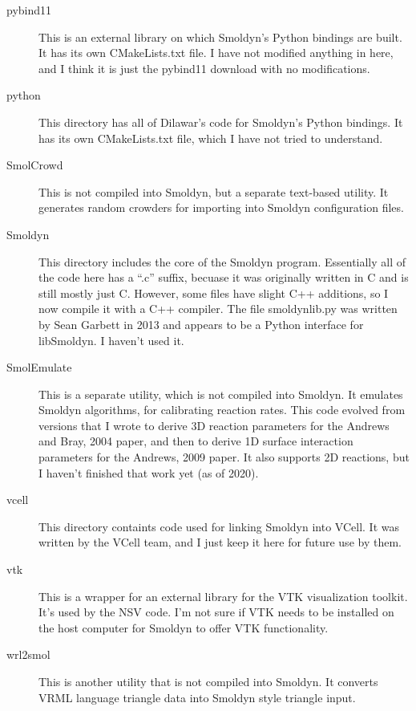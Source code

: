 \documentclass {scrbook}
\begin{document}
\begin{description}
\item[pybind11] This is an external library on which Smoldyn's Python bindings are built. It has its own CMakeLists.txt file. I have not modified anything in here, and I think it is just the pybind11 download with no modifications.

\item[python] This directory has all of Dilawar's code for Smoldyn's Python bindings. It has its own CMakeLists.txt file, which I have not tried to understand.

\item[SmolCrowd] This is not compiled into Smoldyn, but a separate text-based utility. It generates random crowders for importing into Smoldyn configuration files.

\item[Smoldyn] This directory includes the core of the Smoldyn program. Essentially all of the code here has a ``.c'' suffix, becuase it was originally written in C and is still mostly just C. However, some files have slight C++ additions, so I now compile it with a C++ compiler. The file smoldynlib.py was written by Sean Garbett in 2013 and appears to be a Python interface for libSmoldyn. I haven't used it.

\item[SmolEmulate] This is a separate utility, which is not compiled into Smoldyn. It emulates Smoldyn algorithms, for calibrating reaction rates. This code evolved from versions that I wrote to derive 3D reaction parameters for the Andrews and Bray, 2004 paper, and then to derive 1D surface interaction parameters for the Andrews, 2009 paper. It also supports 2D reactions, but I haven't finished that work yet (as of 2020).

\item[vcell] This directory containts code used for linking Smoldyn into VCell. It was written by the VCell team, and I just keep it here for future use by them.

\item[vtk] This is a wrapper for an external library for the VTK visualization toolkit. It's used by the NSV code. I'm not sure if VTK needs to be installed on the host computer for Smoldyn to offer VTK functionality.

\item[wrl2smol] This is another utility that is not compiled into Smoldyn. It converts VRML language triangle data into Smoldyn style triangle input.

\end{description}
\end{document}
